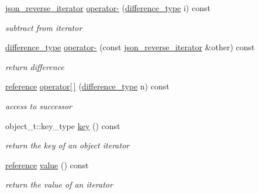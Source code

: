 \begin{DoxyCompactItemize}
\hyperlink{classnlohmann_1_1basic__json_1_1json__reverse__iterator}{json\-\_\-reverse\-\_\-iterator} \hyperlink{classnlohmann_1_1basic__json_1_1json__reverse__iterator_ac2634bee082633671125e909dffad40a}{operator-\/} (\hyperlink{classnlohmann_1_1basic__json_aec316934a555dd1acdd3600e5d4a4cdf}{difference\-\_\-type} i) const 
\begin{DoxyCompactList}\small\item\em subtract from iterator \end{DoxyCompactList}\item 
\hyperlink{classnlohmann_1_1basic__json_aec316934a555dd1acdd3600e5d4a4cdf}{difference\-\_\-type} \hyperlink{classnlohmann_1_1basic__json_1_1json__reverse__iterator_a115fae3dd8ae02669fedae0545ce1cbc}{operator-\/} (const \hyperlink{classnlohmann_1_1basic__json_1_1json__reverse__iterator}{json\-\_\-reverse\-\_\-iterator} \&other) const 
\begin{DoxyCompactList}\small\item\em return difference \end{DoxyCompactList}\item 
\hyperlink{classnlohmann_1_1basic__json_1_1json__reverse__iterator_a7265535f39299824f9712a2ca15013c3}{reference} \hyperlink{classnlohmann_1_1basic__json_1_1json__reverse__iterator_ad4ec2bbb8347e7aa3b58e616fd6c7f40}{operator\mbox{[}$\,$\mbox{]}} (\hyperlink{classnlohmann_1_1basic__json_aec316934a555dd1acdd3600e5d4a4cdf}{difference\-\_\-type} n) const 
\begin{DoxyCompactList}\small\item\em access to successor \end{DoxyCompactList}\item 
object\-\_\-t\-::key\-\_\-type \hyperlink{classnlohmann_1_1basic__json_1_1json__reverse__iterator_acecae6d237fcf14c909fb42b9d2e2955}{key} () const 
\begin{DoxyCompactList}\small\item\em return the key of an object iterator \end{DoxyCompactList}\item 
\hyperlink{classnlohmann_1_1basic__json_1_1json__reverse__iterator_a7265535f39299824f9712a2ca15013c3}{reference} \hyperlink{classnlohmann_1_1basic__json_1_1json__reverse__iterator_aca5116682e206dac48f8a56716a3280b}{value} () const 
\begin{DoxyCompactList}\small\item\em return the value of an iterator \end{DoxyCompactList}\end{DoxyCompactItemize}


